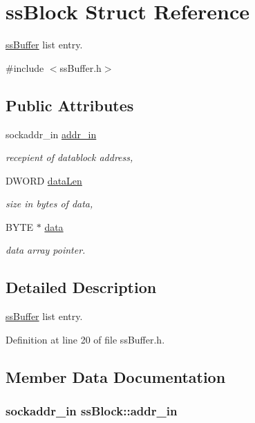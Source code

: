 \hypertarget{structssBlock}{
\section{ssBlock Struct Reference}
\label{d2/dfa/structssBlock}
}


\hyperlink{classssBuffer}{ssBuffer} list entry.  




{\ttfamily \#include $<$ssBuffer.h$>$}

\subsection*{Public Attributes}
\begin{DoxyCompactItemize}
\item 
sockaddr\_\-in \hyperlink{structssBlock_a799c11980e35cc90dad6cb9f0eec574c}{addr\_\-in}
\begin{DoxyCompactList}\small\item\em recepient of datablock address, \item\end{DoxyCompactList}\item 
DWORD \hyperlink{structssBlock_ad3ca966219ea058e35c458f497d1ed0f}{dataLen}
\begin{DoxyCompactList}\small\item\em size in bytes of data, \item\end{DoxyCompactList}\item 
BYTE $\ast$ \hyperlink{structssBlock_ac7f1c86e2783bf2ce7f0caea385d38a2}{data}
\begin{DoxyCompactList}\small\item\em data array pointer. \item\end{DoxyCompactList}\end{DoxyCompactItemize}


\subsection{Detailed Description}
\hyperlink{classssBuffer}{ssBuffer} list entry. 

Definition at line 20 of file ssBuffer.h.



\subsection{Member Data Documentation}
\hypertarget{structssBlock_a799c11980e35cc90dad6cb9f0eec574c}{
\subsubsection[{addr\_\-in}]{\setlength{\rightskip}{0pt plus 5cm}sockaddr\_\-in {\bf ssBlock::addr\_\-in}}}
\label{d2/dfa/structssBlock_a799c11980e35cc90dad6cb9f0eec574c}



